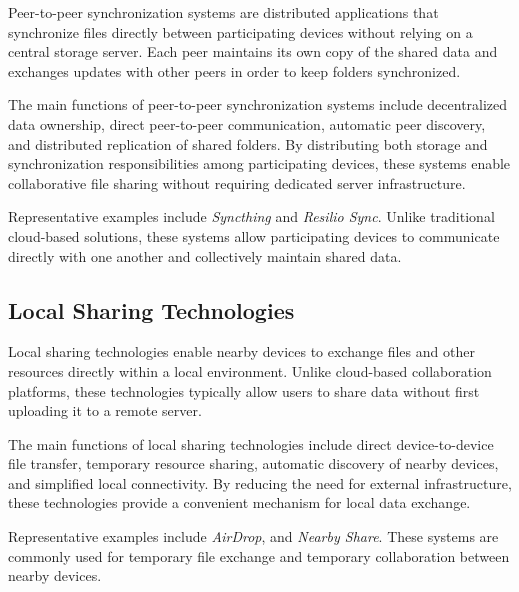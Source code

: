 Peer-to-peer synchronization systems are distributed applications that synchronize files directly between participating devices without relying on a central storage server.
Each peer maintains its own copy of the shared data and exchanges updates with other peers in order to keep folders synchronized.

The main functions of peer-to-peer synchronization systems include decentralized data ownership, direct peer-to-peer communication, automatic peer discovery, and distributed replication of shared folders.
By distributing both storage and synchronization responsibilities among participating devices, these systems enable collaborative file sharing without requiring dedicated server infrastructure.

Representative examples include \textit{Syncthing} and \textit{Resilio Sync}. Unlike traditional cloud-based solutions, these systems allow participating devices to communicate directly with one another and collectively maintain shared data.


\subsection{Local Sharing Technologies}

%
%

Local sharing technologies enable nearby devices to exchange files and other resources directly within a local environment.
Unlike cloud-based collaboration platforms, these technologies typically allow users to share data without first uploading it to a remote server.


The main functions of local sharing technologies include direct device-to-device file transfer, temporary resource sharing, automatic discovery of nearby devices, and simplified local connectivity.
By reducing the need for external infrastructure, these technologies provide a convenient mechanism for local data exchange.

Representative examples include \textit{AirDrop}, and \textit{Nearby Share}.
These systems are commonly used for temporary file exchange and temporary collaboration between nearby devices.

